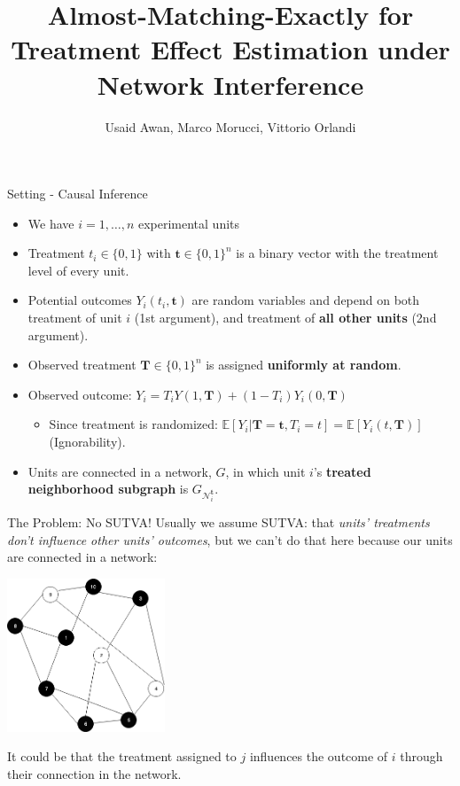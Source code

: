 \documentclass[newPxFont,numfooter,sectionpages]{beamer}
\title{Almost-Matching-Exactly for Treatment Effect Estimation under Network Interference}
\subtitle{}
\author{Usaid Awan, Marco Morucci, Vittorio Orlandi}
\date{}
\newcommand{\E}{\mathbb{E}}
\newcommand{\bt}{\mathbf{t}}
\newcommand{\bT}{\mathbf{T}}
\newcommand{\Gni}{G_{\mathcal{N}_i^\bt}}
\begin{document}
 
\maketitle


\begin{frame}{Setting - Causal Inference}
\begin{itemize}
  \item We have $i=1, \dots, n$ experimental units
  \item Treatment $t_i \in \{0, 1\}$ with $\bt \in \{0, 1\}^n$ is a binary vector with the treatment level of every unit.
  \item Potential outcomes $Y_i(t_i, \bt)$ are random variables and depend on both treatment of unit $i$ (1st argument), and treatment of \textbf{all other units} (2nd argument).
  \item Observed treatment $\bT \in \{0, 1\}^n$ is assigned \textbf{uniformly at random}.
  \item Observed outcome: $Y_i = T_iY(1, \bT) + (1-T_i)Y_i(0, \bT)$
  \begin{itemize}
    \item Since treatment is randomized: $\E[Y_i|\bT = \bt, T_i = t] = \E[Y_i(t, \bT)]$ (Ignorability).
  \end{itemize}
  \item Units are connected in a network, $G$, in which unit $i$'s \textbf{treated neighborhood subgraph} is $\Gni$.
\end{itemize}
\end{frame}

\begin{frame}{The Problem: No SUTVA!}
Usually we assume SUTVA: that \textit{units' treatments don't influence other units' outcomes}, but we can't do that here because our units are connected in a network:
\begin{center}
\includegraphics[height=1.8in]{graph1.png}
\end{center}
It could be that the treatment assigned to $j$ influences the outcome of $i$ through their connection in the network.
\end{frame}
\end{document}
